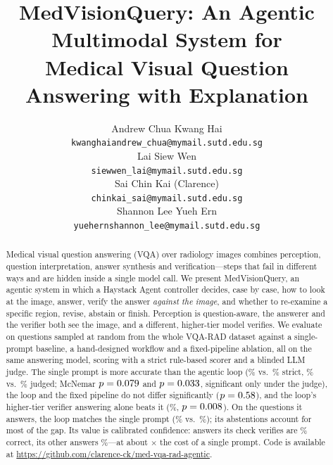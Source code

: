 \documentclass{article}
\title{MedVisionQuery: An Agentic Multimodal System for\\ Medical Visual Question Answering with Explanation}
\author{%
  Andrew Chua Kwang Hai \\
  \texttt{kwanghaiandrew\_chua@mymail.sutd.edu.sg} \\
  \And
  Lai Siew Wen \\
  \texttt{siewwen\_lai@mymail.sutd.edu.sg} \\
  \AND
  Sai Chin Kai (Clarence) \\
  \texttt{chinkai\_sai@mymail.sutd.edu.sg} \\
  \And
  Shannon Lee Yueh Ern \\
  \texttt{yuehernshannon\_lee@mymail.sutd.edu.sg} \\
}
\begin{document}
\maketitle

\begin{abstract}
Medical visual question answering (VQA) over radiology images combines perception, question interpretation,
answer synthesis and verification---steps that fail in different ways and are hidden inside a single model call.
We present MedVisionQuery, an agentic system in which a Haystack Agent controller decides, case by case, how to
look at the image, answer, verify the answer \emph{against the image}, and whether to re-examine a specific region,
revise, abstain or finish. Perception is question-aware, the answerer and the verifier both see the image, and a
different, higher-tier model verifies. We evaluate on \NCases{} questions sampled at random from the whole VQA-RAD
dataset against a single-prompt baseline, a hand-designed workflow and a fixed-pipeline ablation, all on the same
answering model, scoring with a strict rule-based scorer and a blinded LLM judge. The single prompt is more accurate
than the agentic loop (\BaseStrict\% vs.\ \AgStrict\% strict, \BaseJudged\% vs.\ \AgJudged\% judged; McNemar
$p=0.079$ and $p=0.033$, significant only under the judge), the loop and the fixed pipeline do not differ significantly ($p=0.58$), and
the loop's higher-tier verifier answering alone beats it (\BlindStrict\%, $p=0.008$). On the questions it answers, the
loop matches the single prompt (\AnsweredAgAcc\% vs.\ \AnsweredBaseAcc\%); its \PathAbstainN{} abstentions account for
most of the gap. Its value is calibrated confidence: answers its check verifies are \SigVerAcc\% correct, its
other answers \UnverAcc\%---at about \CostRatio$\times$ the cost of a single prompt. Code is available at
\url{https://github.com/clarence-ck/med-vqa-rad-agentic}.
\end{abstract}

\end{document}
